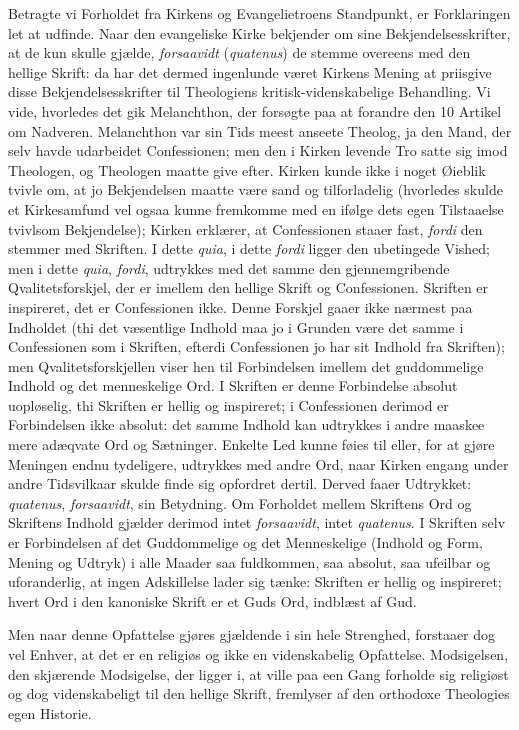 \documentclass[12pt,a4paper]{book}
\newcommand{\opage}[1]{\marginnote{\footnotesize\textit{[#1]}}}
\begin{document}
Betragte vi Forholdet fra Kirkens og Evangelietroens Standpunkt, er
Forklaringen let at udfinde. Naar den evangeliske Kirke bekjender om
sine Bekjendelsesskrifter, at de kun skulle gjælde, \emph{forsaavidt}
(\textit{quatenus}) de stemme overeens med den hellige Skrift: da har
det dermed ingenlunde været Kirkens Mening at priisgive disse
Bekjendelsesskrifter til Theologiens kritisk-videnskabelige
Behandling. Vi vide, hvorledes det gik Melanchthon, der forsøgte paa
at forandre den 10 Artikel om Nadveren. Melanchthon var sin Tids
meest anseete Theolog, ja den Mand, der selv havde udarbeidet
Confessionen; men den i Kirken levende Tro satte sig imod Theologen,
og Theologen maatte give efter. Kirken kunde ikke i noget Øieblik
tvivle om, at jo Bekjendelsen maatte være sand og tilforladelig
(hvorledes skulde et Kirkesamfund vel ogsaa kunne fremkomme med en
ifølge dets egen Tilstaaelse tvivlsom Bekjendelse); Kirken erklærer,
at Confessionen staaer fast, \emph{fordi} den stemmer med Skriften. I
dette \textit{quia}, i dette \emph{fordi} ligger den ubetingede
Vished; men i dette \textit{quia}, \emph{fordi}, udtrykkes med det
samme den gjennemgribende Qvalitetsforskjel, der er imellem den
hellige Skrift og Confessionen. Skriften er inspireret, det er
Confessionen ikke. Denne Forskjel gaaer ikke nærmest paa Indholdet
\opage{33} (thi det væsentlige Indhold maa jo i Grunden være det samme i
Confessionen som i Skriften, efterdi Confessionen jo har sit Indhold
fra Skriften); men Qvalitetsforskjellen viser hen til Forbindelsen
imellem det guddommelige Indhold og det menneskelige Ord. I Skriften
er denne Forbindelse absolut uopløselig, thi Skriften er hellig og
inspireret; i Confessionen derimod er Forbindelsen ikke absolut: det
samme Indhold kan udtrykkes i andre maaskee mere adæqvate Ord og
Sætninger. Enkelte Led kunne føies til eller, for at gjøre Meningen
endnu tydeligere, udtrykkes med andre Ord, naar Kirken engang under
andre Tidsvilkaar skulde finde sig opfordret dertil. Derved faaer
Udtrykket: \textit{quatenus}, \emph{forsaavidt}, sin Betydning. Om
Forholdet mellem Skriftens Ord og Skriftens Indhold gjælder derimod
intet \emph{forsaavidt}, intet \textit{quatenus}. I Skriften selv er
Forbindelsen af det Guddommelige og det Menneskelige (Indhold og
Form, Mening og Udtryk) i alle Maader saa fuldkommen, saa absolut,
saa ufeilbar og uforanderlig, at ingen Adskillelse lader sig tænke:
Skriften er hellig og inspireret; hvert Ord i den kanoniske Skrift er
et Guds Ord, indblæst af Gud.

Men naar denne Opfattelse gjøres gjældende i sin hele Strenghed,
forstaaer dog vel Enhver, at det er en religiøs og ikke en
videnskabelig Opfattelse. Modsigelsen, den skjærende Modsigelse, der
ligger i, at ville paa een Gang forholde sig religiøst og dog
videnskabeligt til den hellige Skrift, fremlyser af den orthodoxe
Theologies egen Historie.
\end{document}
